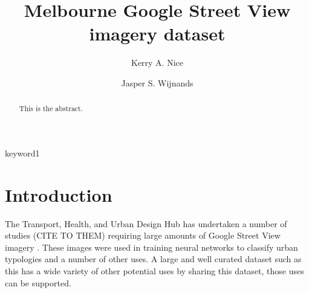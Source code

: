 \documentclass[final,3p,times,authoryear]{elsarticle}
\begin{document}
\begin{frontmatter}



\title{Melbourne Google Street View imagery dataset} 




\author[melb]{Kerry A. Nice}

\author[melb]{Jasper S. Wijnands}

\address[melb]{Transport, Health, and Urban Design Hub, Faculty of Architecture, Building, and Planning, University of Melbourne, Victoria 3010, Australia}

\begin{abstract}


This is the abstract.
\end{abstract}

\begin{keyword}
keyword1

\end{keyword}

\end{frontmatter}




\section{Introduction}\label{sec:introduction}
The Transport, Health, and Urban Design Hub has undertaken a number of studies (CITE TO THEM) requiring large amounts of Google Street View imagery \citep{GoogleMaps2017b}. These images were used in training neural networks to classify urban typologies and a number of other uses. A large and well curated dataset such as this has a wide variety of other potential uses by sharing this dataset, those uses can be supported.
\end{document}
